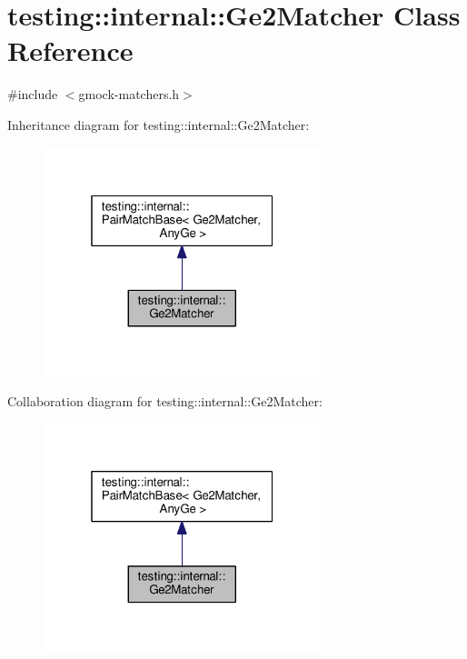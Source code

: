 \hypertarget{classtesting_1_1internal_1_1_ge2_matcher}{}\section{testing\+:\+:internal\+:\+:Ge2\+Matcher Class Reference}
\label{classtesting_1_1internal_1_1_ge2_matcher}


{\ttfamily \#include $<$gmock-\/matchers.\+h$>$}



Inheritance diagram for testing\+:\+:internal\+:\+:Ge2\+Matcher\+:
\nopagebreak
\begin{figure}[H]
\begin{center}
\leavevmode
\includegraphics[width=229pt]{classtesting_1_1internal_1_1_ge2_matcher__inherit__graph}
\end{center}
\end{figure}


Collaboration diagram for testing\+:\+:internal\+:\+:Ge2\+Matcher\+:
\nopagebreak
\begin{figure}[H]
\begin{center}
\leavevmode
\includegraphics[width=229pt]{classtesting_1_1internal_1_1_ge2_matcher__coll__graph}
\end{center}
\end{figure}
